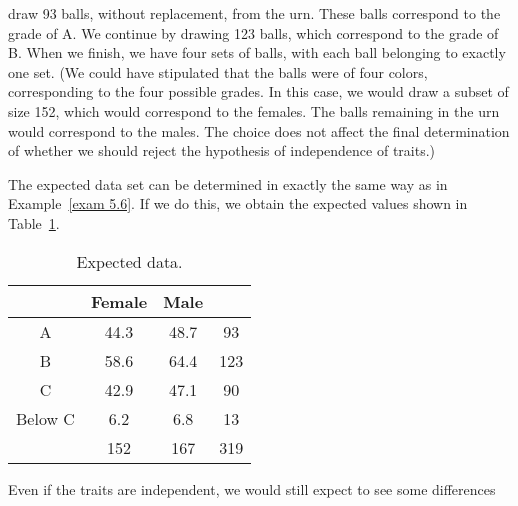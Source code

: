 \begin{example}
draw 93 balls, without replacement, from the urn.  These balls correspond to the
grade of A.   We continue by drawing 123 balls, which correspond to the grade of B.  
When we finish, we have four sets of balls, with each ball belonging to exactly one
set.  (We could have stipulated that the balls were of four colors, corresponding to
the four possible grades.  In this case, we would draw a subset of size 152, which
would correspond to the females.  The balls remaining in the urn would correspond to
the males.  The choice does not affect the final determination of whether we should
reject the hypothesis of independence of traits.)
\par
The expected data set can be determined in exactly the same way as in
Example~\ref{exam 5.6}.  If we do this, we obtain the expected
values shown in Table~\ref{table 5.8}.
\begin{table}
\centering
\begin{tabular}{|c|c|c|c|}
\hline
       & Female \hspace{.15in}&\hspace{.15in}Male\hspace{.15in}&         \\ \hline 
A      & \hspace{.15in}44.3     & \hspace{.15in}48.7  &\hspace{.15in}93  \\ \hline 
B      & \hspace{.15in}58.6     & \hspace{.15in}64.4  &\hspace{.075in}123\\ \hline 
C      & \hspace{.15in}42.9     & \hspace{.15in}47.1  &\hspace{.15in}90  \\ \hline 
Below C& \hspace{.15in}6.2     & \hspace{.2in}6.8    &\hspace{.15in}13  \\ \hline 
       &  152                   &  167                &\hspace{.075in}319\\ 
\hline
\end{tabular}
\caption{Expected data.}
\label{table 5.8}
\end{table}
Even if the traits are independent, we would still expect to see some differences

\end{example}
